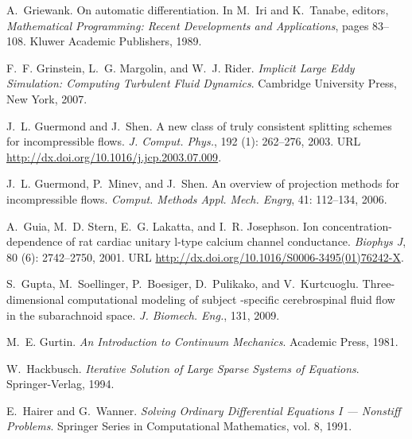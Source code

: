 \begin{thebibliography}{467}
A.~Griewank.
\newblock On automatic differentiation.
\newblock In M.~Iri and K.~Tanabe, editors, \emph{Mathematical Programming:
  Recent Developments and Applications}, pages 83--108. Kluwer Academic
  Publishers, 1989.

F.~F. Grinstein, L.~G. Margolin, and W.~J. Rider.
\newblock \emph{Implicit Large Eddy Simulation: Computing Turbulent Fluid
  Dynamics}.
\newblock Cambridge University Press, New York, 2007.

J.~L. Guermond and J.~Shen.
\newblock A new class of truly consistent splitting schemes for incompressible
  flows.
\newblock \emph{J. Comput. Phys.}, 192 (1): 262--276, 2003.
\newblock URL \url{http://dx.doi.org/10.1016/j.jcp.2003.07.009}.

J.~L. Guermond, P.~Minev, and J.~Shen.
\newblock An overview of projection methods for incompressible flows.
\newblock \emph{Comput. Methods Appl. Mech. Engrg}, 41: 112--134,
  2006.

A.~Guia, M.~D. Stern, E.~G. Lakatta, and I.~R. Josephson.
\newblock Ion concentration-dependence of rat cardiac unitary l-type calcium
  channel conductance.
\newblock \emph{Biophys J}, 80 (6): 2742--2750, 2001.
\newblock URL \url{http://dx.doi.org/10.1016/S0006-3495(01)76242-X}.

S.~Gupta, M.~Soellinger, P.~Boesiger, D.~Pulikako, and V.~Kurtcuoglu.
\newblock Three-dimensional computational modeling of subject -specific
  cerebrospinal fluid flow in the subarachnoid space.
\newblock \emph{J. Biomech. Eng.}, 131, 2009.

M.~E. Gurtin.
\newblock \emph{An Introduction to Continuum Mechanics}.
\newblock Academic Press, 1981.

W.~Hackbusch.
\newblock \emph{Iterative Solution of Large Sparse Systems of Equations}.
\newblock Springer-Verlag, 1994.

E.~Hairer and G.~Wanner.
\newblock \emph{Solving Ordinary Differential Equations {I} --- Nonstiff
  Problems}.
\newblock Springer Series in Computational Mathematics, vol. 8,
  1991{}.


\end{thebibliography}
